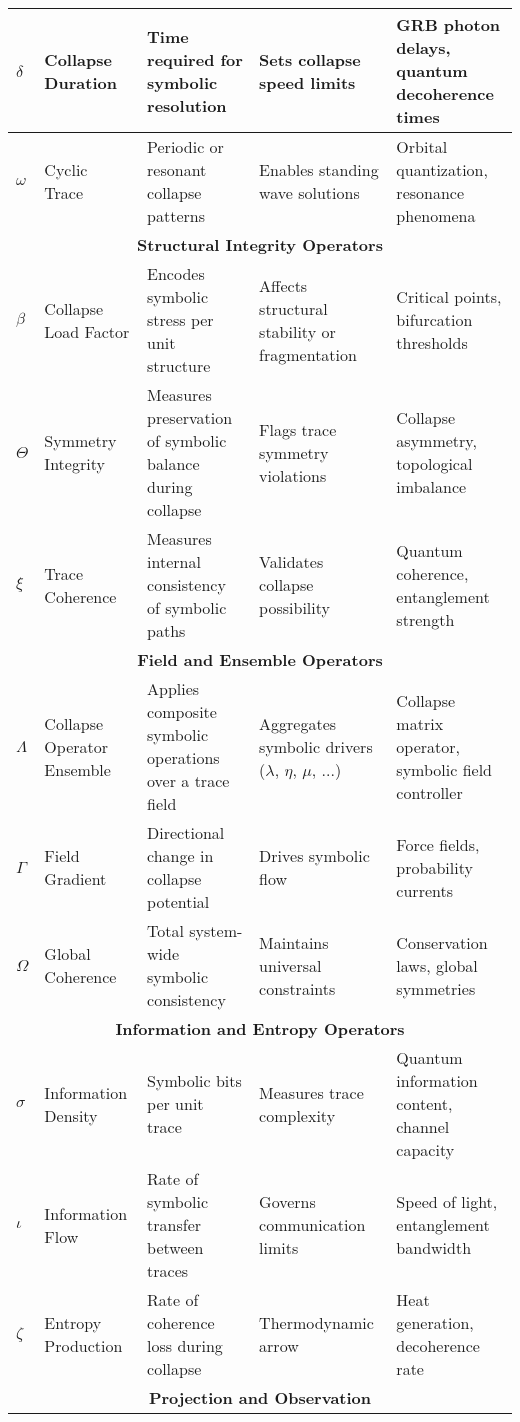 \documentclass[11pt]{article}
\begin{document}
\begin{table}[H]
\begin{tabular}{|p{1.5cm}|p{3cm}|p{4cm}|p{4cm}|p{4cm}|}
\hline
$\delta$ & Collapse Duration & Time required for symbolic resolution & Sets collapse speed limits & GRB photon delays, quantum decoherence times \\
\hline
$\omega$ & Cyclic Trace & Periodic or resonant collapse patterns & Enables standing wave solutions & Orbital quantization, resonance phenomena \\
\hline
\multicolumn{5}{|c|}{\textbf{Structural Integrity Operators}} \\
\hline
$\beta$ & Collapse Load Factor & Encodes symbolic stress per unit structure & Affects structural stability or fragmentation & Critical points, bifurcation thresholds \\
\hline
$\Theta$ & Symmetry Integrity & Measures preservation of symbolic balance during collapse & Flags trace symmetry violations & Collapse asymmetry, topological imbalance \\
\hline
$\xi$ & Trace Coherence & Measures internal consistency of symbolic paths & Validates collapse possibility & Quantum coherence, entanglement strength \\
\hline
\multicolumn{5}{|c|}{\textbf{Field and Ensemble Operators}} \\
\hline
$\Lambda$ & Collapse Operator Ensemble & Applies composite symbolic operations over a trace field & Aggregates symbolic drivers ($\lambda$, $\eta$, $\mu$, ...) & Collapse matrix operator, symbolic field controller \\
\hline
$\Gamma$ & Field Gradient & Directional change in collapse potential & Drives symbolic flow & Force fields, probability currents \\
\hline
$\Omega$ & Global Coherence & Total system-wide symbolic consistency & Maintains universal constraints & Conservation laws, global symmetries \\
\hline
\multicolumn{5}{|c|}{\textbf{Information and Entropy Operators}} \\
\hline
$\sigma$ & Information Density & Symbolic bits per unit trace & Measures trace complexity & Quantum information content, channel capacity \\
\hline
$\iota$ & Information Flow & Rate of symbolic transfer between traces & Governs communication limits & Speed of light, entanglement bandwidth \\
\hline
$\zeta$ & Entropy Production & Rate of coherence loss during collapse & Thermodynamic arrow & Heat generation, decoherence rate \\
\hline
\multicolumn{5}{|c|}{\textbf{Projection and Observation}} \\

\end{tabular}
\end{table}
\end{document}
